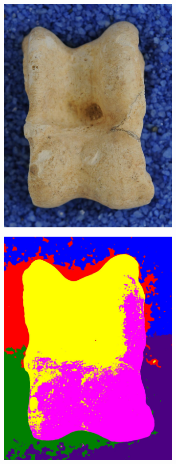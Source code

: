 \documentclass[pdftex,12pt,a4paper]{report}
\begin{document}
\begin{figure}[h]
	\centering
	\begin{subfigure}[b]{0.24\textwidth}
		\centering
		\includegraphics[width=.9\linewidth]{img/segmentation/good/slic/cut.jpg}
		\subcaption{}
		\label{fig:slic:good}
	\end{subfigure}
	\begin{subfigure}[b]{0.24\textwidth}
		\centering
		\includegraphics[width=.9\linewidth]{img/segmentation/good/slic/segmented.jpg}

\end{subfigure}
\end{figure}
\end{document}
